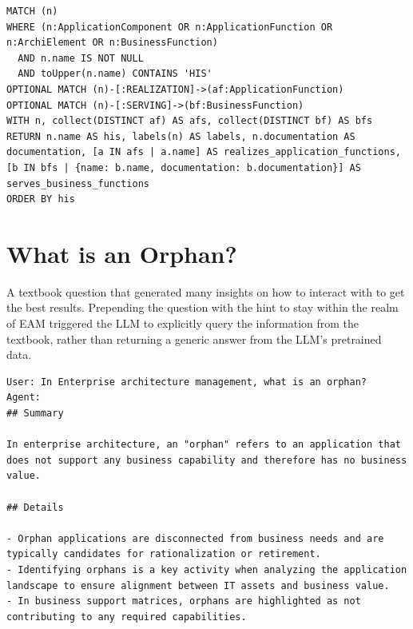 \begin{lstlisting}[style=cypherstyle, label={lst:cWhatIsHis},caption={The Cypher used to retrieve information on the HIS application from the examination office's knowledge graph.}]
MATCH (n)
WHERE (n:ApplicationComponent OR n:ApplicationFunction OR n:ArchiElement OR n:BusinessFunction)
  AND n.name IS NOT NULL
  AND toUpper(n.name) CONTAINS 'HIS'
OPTIONAL MATCH (n)-[:REALIZATION]->(af:ApplicationFunction)
OPTIONAL MATCH (n)-[:SERVING]->(bf:BusinessFunction)
WITH n, collect(DISTINCT af) AS afs, collect(DISTINCT bf) AS bfs
RETURN n.name AS his, labels(n) AS labels, n.documentation AS documentation, [a IN afs | a.name] AS realizes_application_functions, [b IN bfs | {name: b.name, documentation: b.documentation}] AS serves_business_functions
ORDER BY his
\end{lstlisting}




\section{What is an Orphan?}
\label{appendix:code:whatIsAnOrphan}
A textbook question that generated many insights on how to interact with \prototype{} to get the best results. Prepending the question with the hint to stay within the realm of EAM triggered the LLM to explicitly query the information from the textbook, rather than returning a generic answer from the LLM's pretrained data.

\begin{lstlisting}[style=cypherstyle, label={lst:qWhatIsAnOrphan},caption={Asking \prototype{} what an orphan is in the realm of EAM.}]
User: In Enterprise architecture management, what is an orphan?
Agent:
## Summary

In enterprise architecture, an "orphan" refers to an application that does not support any business capability and therefore has no business value.

## Details

- Orphan applications are disconnected from business needs and are typically candidates for rationalization or retirement.
- Identifying orphans is a key activity when analyzing the application landscape to ensure alignment between IT assets and business value.
- In business support matrices, orphans are highlighted as not contributing to any required capabilities.

\end{lstlisting}

